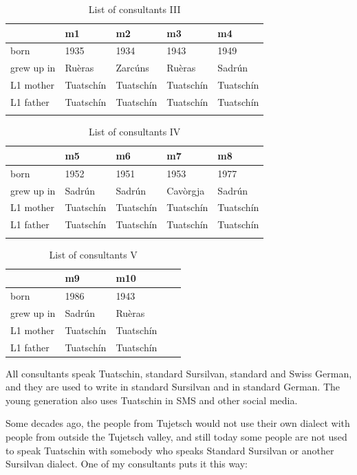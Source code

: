 \begin{table}
	\caption{List of consultants III}
	\label{tab:consultantsIII}
	\begin{tabular}{lllll}
		\lsptoprule
		& m1 & m2 & m3 & m4\\
		\midrule
		born & 1935 & 1934 & 1943 & 1949 \\
		grew up in & Ruèras & Zarcúns & Ruèras & Sadrún\\
		L1 mother & Tuatschín & Tuatschín & Tuatschín & Tuatschín\\
		L1 father & Tuatschín & Tuatschín & Tuatschín & Tuatschín\\
		\lspbottomrule
	\end{tabular}
\end{table}

\begin{table}
	\caption{List of consultants IV}
	\label{tab:consultantsIV}
	\begin{tabular}{lllll}
		\lsptoprule
		& m5 & m6 & m7 & m8\\
		\midrule
		born & 1952 & 1951 & 1953 & 1977\\
		grew up in & Sadrún & Sadrún & Cavòrgja & Sadrún\\
		L1 mother & Tuatschín & Tuatschín & Tuatschín & Tuatschín \\
		L1 father & Tuatschín & Tuatschín  & Tuatschín & Tuatschín\\
		\lspbottomrule
	\end{tabular}
\end{table}

\begin{table}
	\caption{List of consultants V}
	\label{tab:consultantsV}
	\begin{tabular}{lllll}
		\lsptoprule
		& m9 & m10\\
		\midrule
		born   & 1986 & 1943\\
		grew up in   &  Sadrún & Ruèras \\
		L1 mother & Tuatschín & Tuatschín\\
		L1 father  & Tuatschín & Tuatschín\\
		\end{tabular}
\end{table}

All consultants speak Tuatschin, standard Sursilvan, standard and Swiss German, and they are used to write in standard Sursilvan and in standard German. The young generation also uses Tuatschin in SMS and other social media.

Some decades ago, the people from Tujetsch would not use their own dialect with people from outside the Tujetsch valley, and still today some people are not used to speak Tuatschin with somebody who speaks Standard Sursilvan or another Sursilvan dialect. One of my consultants puts it this way:

